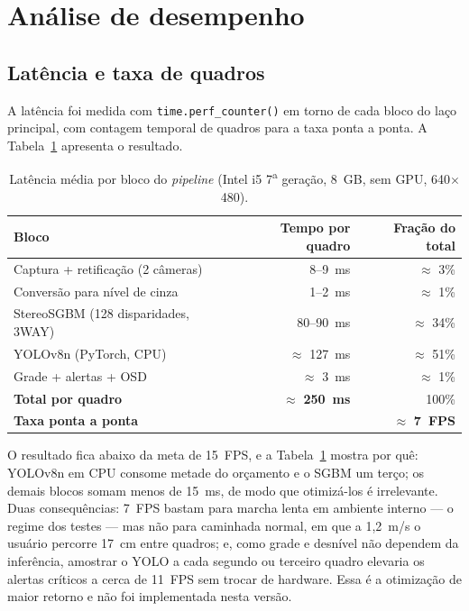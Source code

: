 \documentclass[12pt]{article}
\begin{document}
\section{Análise de desempenho}

\subsection{Latência e taxa de quadros}

A latência foi medida com \texttt{time.perf\_counter()} em torno de cada bloco
do laço principal, com contagem temporal de quadros para a taxa ponta a ponta.
A Tabela~\ref{tab1} apresenta o resultado.

\begin{table}[ht]
\centering
\caption{Latência média por bloco do \textit{pipeline} (Intel i5 7\textsuperscript{a} geração, 8~GB, sem GPU, 640$\times$480).}
\label{tab1}
\footnotesize
\begin{tabular}{lrr}
\toprule
\textbf{Bloco} & \textbf{Tempo por quadro} & \textbf{Fração do total} \\
\midrule
Captura + retificação (2 câmeras) & 8--9~ms & $\approx$ 3\% \\
Conversão para nível de cinza & 1--2~ms & $\approx$ 1\% \\
StereoSGBM (128 disparidades, 3WAY) & 80--90~ms & $\approx$ 34\% \\
YOLOv8n (PyTorch, CPU) & $\approx$ 127~ms & $\approx$ 51\% \\
Grade + alertas + OSD & $\approx$ 3~ms & $\approx$ 1\% \\
\midrule
\textbf{Total por quadro} & $\approx$ \textbf{250~ms} & 100\% \\
\textbf{Taxa ponta a ponta} & \multicolumn{2}{r}{$\approx$ \textbf{7~FPS}} \\
\bottomrule
\end{tabular}
\end{table}

O resultado fica abaixo da meta de 15~FPS, e a Tabela~\ref{tab1} mostra por
quê: YOLOv8n em CPU consome metade do orçamento e o SGBM um terço; os demais
blocos somam menos de 15~ms, de modo que otimizá-los é irrelevante. Duas
consequências: 7~FPS bastam para marcha lenta em ambiente interno --- o regime
dos testes --- mas não para caminhada normal, em que a 1,2~m/s o usuário
percorre 17~cm entre quadros; e, como grade e desnível não dependem da
inferência, amostrar o YOLO a cada segundo ou terceiro quadro elevaria os
alertas críticos a cerca de 11~FPS sem trocar de hardware. Essa é a otimização
de maior retorno e não foi implementada nesta versão.
\end{document}
